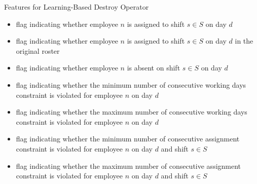 \documentclass[aspectratio=1610]{beamer}
\renewcommand{\footnotesize}{\scriptsize}
\begin{document}
\begin{frame}{Features for Learning-Based Destroy Operator}
	\footnotesize
	\begin{itemize}
		\item flag indicating whether employee $n$ is assigned to shift $s \in S$ on day $d$  
		\item flag indicating whether employee $n$ is assigned to shift $s \in S$ on day $d$ in the original roster 
		\item flag indicating whether employee $n$ is absent on shift $s \in S$ on day $d$  
		\item flag indicating whether the minimum number of consecutive working days constraint is violated for employee $n$ on day $d$
		\item flag indicating whether the maximum number of consecutive working days constraint is violated for employee $n$ on day $d$  
		\item flag indicating whether the minimum number of consecutive assignment constraint is violated for employee $n$ on day $d$ and shift $s \in S$  
		\item flag indicating whether the maximum number of consecutive assignment constraint is violated for employee $n$ on day $d$ and shift $s \in S$  
	\end{itemize}
\end{frame}
\end{document}
